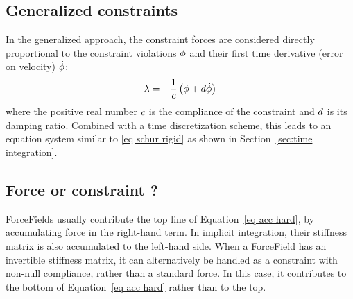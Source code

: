 \subsection{Generalized constraints}
In the generalized approach, the constraint forces are considered directly proportional to the constraint violations $\phi$ and their first time derivative (error on velocity) $\dot {\phi}$:
\begin{equation}\label{eq generalized constraint}
\mathbf{\lambda} = - \frac{1}{c} \left( \phi + d \dot {\phi} \right)
\end{equation}
where the positive real number $c$ is the compliance of the constraint and $d$ is its damping ratio.
Combined with a time discretization scheme, this leads to an equation system similar to \eqref{eq schur rigid} as shown in Section~\ref{sec:time integration}.

\subsection{Force or constraint ?} \label{sec force or constraint}
ForceFields usually contribute the top line of Equation~\ref{eq acc hard}, by accumulating force in the right-hand term. In implicit integration, their stiffness matrix is also accumulated to the left-hand side.
When a ForceField has an invertible stiffness matrix, it can alternatively be handled as a constraint with non-null compliance, rather than a standard force. In this case, it contributes to the bottom of Equation~\ref{eq acc hard} rather than to the top.

